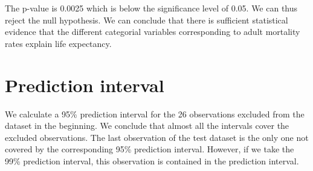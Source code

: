 The p-value is 0.0025 which is below the significance level of 0.05. We can thus reject the null hypothesis. We can conclude that there is sufficient statistical evidence that the different categorial variables corresponding to adult mortality rates explain life expectancy. 

\section{Prediction interval}

We calculate a 95\% prediction interval for the 26 observations excluded from the dataset in the beginning. We conclude that almost all the intervals cover the excluded observations. The last observation of the test dataset is the only one not covered by the corresponding 95\% prediction interval. However, if we take the 99\% prediction interval, this observation is contained in the prediction interval.
